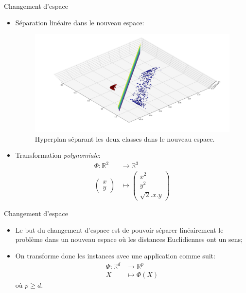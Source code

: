 \documentclass[8pt]{beamer}
\begin{document}
	\begin{frame}[plain]{Changement d'espace}
		\begin{itemize}
			\item <1-> Séparation linéaire dans le nouveau espace:
			\begin{figure}[H]
				\includegraphics[width=.7\textwidth]{images/samples/separation_pol_2_3}
				\caption*{\label{fig::pol_take_3} Hyperplan séparant les deux classes dans le nouveau espace.}

			\end{figure}
			\item <2-> Transformation \textit{polynomiale}:
			\begin{align*}
				\Phi: \mathbb{R}^2 &\rightarrow \mathbb{R}^3 \\
				\begin{pmatrix}
					x \\
					y
				\end{pmatrix} &\mapsto \begin{pmatrix}
					x^2 \\
					y^2 \\
					\sqrt{2}.x.y
				\end{pmatrix}
			\end{align*}
		\end{itemize}
	\end{frame}
	\begin{frame}{Changement d'espace}
		\begin{itemize}
			\item  Le but du changement d'espace est de pouvoir séparer linéairement le problème dans un nouveau espace où les distances Euclidiennes ont un sens;
			\item  On transforme donc les instances avec une application comme suit:
			\begin{align*}
				\Phi: \mathbb{R}^d &\rightarrow \mathbb{R}^p \\
				X &\mapsto \Phi(X)
			\end{align*}
			où $p\geq d$.
		\end{itemize}
	\end{frame}
\end{document}
